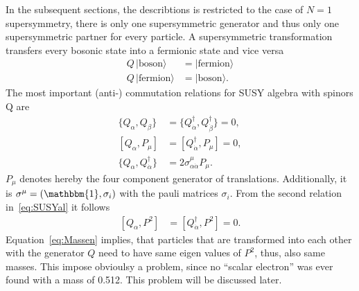 In the subsequent sections, the describtions is restricted to the case of $N=1$ supersymmetry, \ie there is only one supersymmetric generator and thus only one supersymmetric partner for every particle.
A supersymmetric transformation transfers every bosonic state into a fermionic state and vice versa  
\begin{equation}
\begin{split}
 Q\, |\text{boson}\rangle  &= |\text{fermion}\rangle\\ 
 Q\, |\text{fermion}\rangle  &= |\text{boson}\rangle.
\end{split}
\end{equation}
The most important (anti-) commutation relations for SUSY algebra with spinors Q are
\begin{align}
\label{eq:SUSYal}
 \{Q_{\alpha},Q_{\beta} \} &=  \{Q^{\dagger}_{\dot{\alpha}},Q^{\dagger}_{\dot{\beta}} \} = 0,\nonumber \\
   [Q_{\alpha} , P_{\mu}] &=  [Q^{\dagger}_{\dot{\alpha}}, P_{\mu}] = 0 ,\\
\{Q_{\alpha},  Q^{\dagger}_{\dot{\alpha}}\} &= 2 \sigma_{\alpha\dot{\alpha}}^{\mu} P_{\mu} \nonumber.
\end{align}
$P_{\mu}$ denotes hereby the four component generator of translations. 
Additionally, it is $\sigma^{\mu} = \left( \mathbbm{1}, \sigma_i  \right)$ with the pauli matrices $\sigma_i$.
From the second relation in~\eqref{eq:SUSYal} it follows
\begin{align}
\label{eq:Massen}
 [Q_{\alpha} , P^2] &=  [Q^{\dagger}_{\dot{\alpha}}, P^2] = 0.
\end{align}
Equation~\ref{eq:Massen} implies, that particles that are transformed into each other with the generator $Q$ need to have same eigen values of $P^2$, thus, also same masses.
This impose obvioulsy a problem, since no ``scalar electron'' was ever found with a mass of 0.512\mev.
This problem will be discussed later.\\

